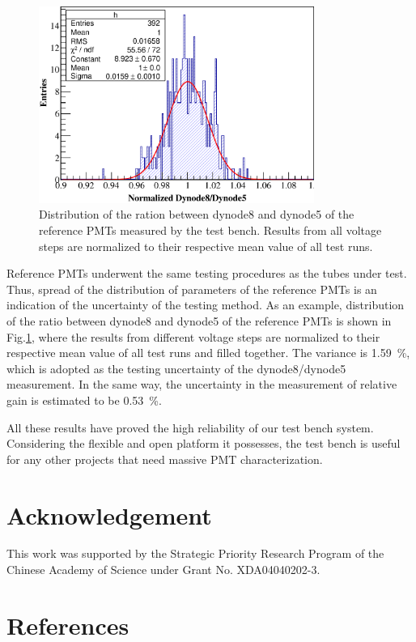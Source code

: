 \documentclass[review, times]{elsarticle}
\begin{document}
\begin{figure}
 \centering
 \includegraphics[width=90mm]{FIG14}
\caption{Distribution of the ration between dynode8 and dynode5 of the reference PMTs measured by the test bench.
Results from all voltage steps are normalized to their respective mean value of all test runs.}
\label{fig:FIG14}
\end{figure} 

Reference PMTs underwent the same testing procedures as the tubes under test.
Thus, spread of the distribution of parameters of the reference PMTs is an indication of the uncertainty of the testing method.
As an example, distribution of the ratio between dynode8 and dynode5 of the reference PMTs is shown in Fig.\ref{fig:FIG14}, where the results from different voltage steps are normalized to their respective mean value of all test runs and filled together.
The variance is \SI{1.59}{\percent}, which is adopted as the testing uncertainty of the dynode8/dynode5 measurement.
In the same way, the uncertainty in the measurement of relative gain is estimated to be \SI{0.53}{\percent}. 

All these results have proved the high reliability of our test bench system.
Considering the flexible and open platform it possesses, the test bench is useful for any other projects that need massive PMT characterization. 

\section*{Acknowledgement}
\label{sec:acknowledgement}

This work was supported by the Strategic Priority Research Program of the Chinese Academy of Science under Grant No. XDA04040202-3.


\section*{References}
\label{sec:reference}



\end{document}
